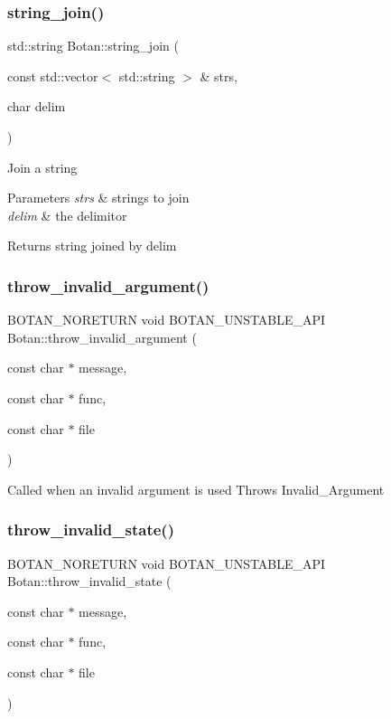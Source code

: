 \subsubsection{\texorpdfstring{string\+\_\+join()}{string\_join()}}
{\footnotesize\ttfamily std\+::string Botan\+::string\+\_\+join (\begin{DoxyParamCaption}\item[{const std\+::vector$<$ std\+::string $>$ \&}]{strs,  }\item[{char}]{delim }\end{DoxyParamCaption})}

Join a string 
\begin{DoxyParams}{Parameters}
{\em strs} & strings to join \\
\hline
{\em delim} & the delimitor \\
\hline
\end{DoxyParams}
\begin{DoxyReturn}{Returns}
string joined by delim 
\end{DoxyReturn}
\mbox{\label{namespace_botan_aaf096546028928a2d760aa504a9a2a74}} 
\subsubsection{\texorpdfstring{throw\+\_\+invalid\+\_\+argument()}{throw\_invalid\_argument()}}
{\footnotesize\ttfamily B\+O\+T\+A\+N\+\_\+\+N\+O\+R\+E\+T\+U\+RN void B\+O\+T\+A\+N\+\_\+\+U\+N\+S\+T\+A\+B\+L\+E\+\_\+\+A\+PI Botan\+::throw\+\_\+invalid\+\_\+argument (\begin{DoxyParamCaption}\item[{const char $\ast$}]{message,  }\item[{const char $\ast$}]{func,  }\item[{const char $\ast$}]{file }\end{DoxyParamCaption})}

Called when an invalid argument is used Throws Invalid\+\_\+\+Argument \mbox{\label{namespace_botan_a250ba8106fea7c03f69342277f3065e6}} 
\subsubsection{\texorpdfstring{throw\+\_\+invalid\+\_\+state()}{throw\_invalid\_state()}}
{\footnotesize\ttfamily B\+O\+T\+A\+N\+\_\+\+N\+O\+R\+E\+T\+U\+RN void B\+O\+T\+A\+N\+\_\+\+U\+N\+S\+T\+A\+B\+L\+E\+\_\+\+A\+PI Botan\+::throw\+\_\+invalid\+\_\+state (\begin{DoxyParamCaption}\item[{const char $\ast$}]{message,  }\item[{const char $\ast$}]{func,  }\item[{const char $\ast$}]{file }\end{DoxyParamCaption})}

